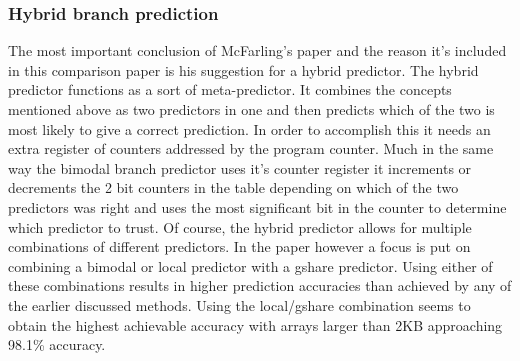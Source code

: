 \subsubsection{Hybrid branch prediction}
The most important conclusion of McFarling's paper and the reason it's included in this comparison paper is his suggestion for a hybrid predictor. The hybrid predictor functions as a sort of meta-predictor. It combines the concepts mentioned above as two predictors in one and then predicts which of the two is most likely to give a correct prediction. In order to accomplish this it needs an extra register of counters addressed by the program counter. Much in the same way the bimodal branch predictor uses it's counter register it increments or decrements the 2 bit counters in the table depending on which of the two predictors was right and uses the most significant bit in the counter to determine which predictor to trust. Of course, the hybrid predictor allows for multiple combinations of different predictors. In the paper however a focus is put on combining a bimodal or local predictor with a gshare predictor. Using either of these combinations results in higher prediction accuracies than achieved by any of the earlier discussed methods. Using the local/gshare combination seems to obtain the highest achievable accuracy with arrays larger than 2KB approaching 98.1\% accuracy.